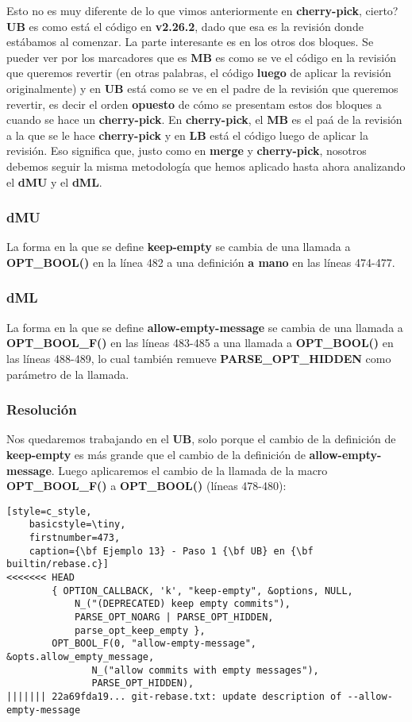 Esto no es muy diferente de lo que vimos anteriormente en {\bf cherry-pick}, cierto? {\bf UB} es como está el
código en {\bf v2.26.2}, dado que esa es la revisión donde estábamos al comenzar. La parte interesante es en los otros
dos bloques. Se pueder ver por los marcadores que es {\bf MB} es como se ve el código en la revisión que queremos revertir
(en otras palabras, el código {\bf luego} de aplicar la revisión originalmente) y en {\bf UB} está como se ve en el padre
de la revisión que queremos revertir, es decir el orden {\bf opuesto} de cómo se presentam estos dos bloques a cuando se
hace un {\bf cherry-pick}. En {\bf cherry-pick}, el {\bf MB} es el paá de la revisión a la que se le hace {\bf cherry-pick}
y en {\bf LB} está el código luego de aplicar la revisión. Eso significa que, justo como en {\bf merge} y {\bf cherry-pick},
nosotros debemos seguir la misma metodología que hemos aplicado hasta ahora analizando el {\bf dMU} y el {\bf dML}.

\subsubsection{dMU}
La forma en la que se define {\bf keep-empty} se cambia de una llamada a {\bf OPT\_BOOL()} en la línea 482 a una definición
{\bf a mano} en las líneas 474-477.

\subsubsection{dML}
La forma en la que se define {\bf allow-empty-message} se cambia de una llamada a {\bf OPT\_BOOL\_F()} en las líneas 483-485 a
una llamada a {\bf OPT\_BOOL()} en las líneas 488-489, lo cual también remueve {\bf PARSE\_OPT\_HIDDEN} como parámetro de la
llamada.

\subsubsection{Resolución}
Nos quedaremos trabajando en el {\bf UB}, solo porque el cambio de la definición de {\bf keep-empty} es más grande que 
el cambio de la definición de {\bf allow-empty-message}. Luego aplicaremos el cambio de la llamada de la macro {\bf OPT\_BOOL\_F()}
a {\bf OPT\_BOOL()} (líneas 478-480):

\begin{lstlisting}[style=c_style,
	basicstyle=\tiny,
	firstnumber=473,
	caption={\bf Ejemplo 13} - Paso 1 {\bf UB} en {\bf builtin/rebase.c}]
<<<<<<< HEAD
		{ OPTION_CALLBACK, 'k', "keep-empty", &options, NULL,
			N_("(DEPRECATED) keep empty commits"),
			PARSE_OPT_NOARG | PARSE_OPT_HIDDEN,
			parse_opt_keep_empty },
		OPT_BOOL_F(0, "allow-empty-message", &opts.allow_empty_message,
			   N_("allow commits with empty messages"),
			   PARSE_OPT_HIDDEN),
||||||| 22a69fda19... git-rebase.txt: update description of --allow-empty-message
\end{lstlisting}


